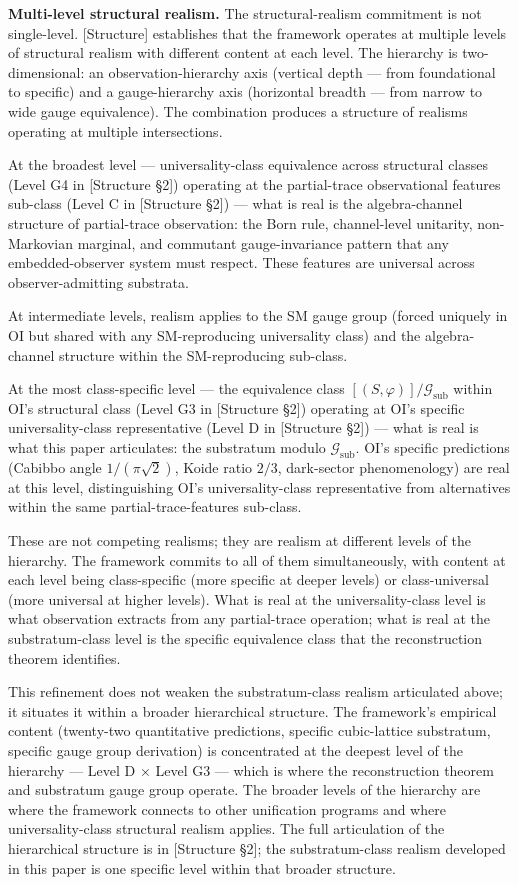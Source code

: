 \documentclass[
]{article}
\begin{document}
\textbf{Multi-level structural realism.} The structural-realism
commitment is not single-level. {[}Structure{]} establishes that the
framework operates at multiple levels of structural realism with
different content at each level. The hierarchy is two-dimensional: an
observation-hierarchy axis (vertical depth --- from foundational to
specific) and a gauge-hierarchy axis (horizontal breadth --- from narrow
to wide gauge equivalence). The combination produces a structure of
realisms operating at multiple intersections.

At the broadest level --- universality-class equivalence across
structural classes (Level G4 in {[}Structure §2{]}) operating at the
partial-trace observational features sub-class (Level C in {[}Structure
§2{]}) --- what is real is the algebra-channel structure of
partial-trace observation: the Born rule, channel-level unitarity,
non-Markovian marginal, and commutant gauge-invariance pattern that any
embedded-observer system must respect. These features are universal
across observer-admitting substrata.

At intermediate levels, realism applies to the SM gauge group (forced
uniquely in OI but shared with any SM-reproducing universality class)
and the algebra-channel structure within the SM-reproducing sub-class.

At the most class-specific level --- the equivalence class
\([(S, \varphi)] / \mathcal{G}_{\text{sub}}\) within OI's structural
class (Level G3 in {[}Structure §2{]}) operating at OI's specific
universality-class representative (Level D in {[}Structure §2{]}) ---
what is real is what this paper articulates: the substratum modulo
\(\mathcal{G}_{\text{sub}}\). OI's specific predictions (Cabibbo angle
\(1/(\pi\sqrt{2})\), Koide ratio \(2/3\), dark-sector phenomenology) are
real at this level, distinguishing OI's universality-class
representative from alternatives within the same partial-trace-features
sub-class.

These are not competing realisms; they are realism at different levels
of the hierarchy. The framework commits to all of them simultaneously,
with content at each level being class-specific (more specific at deeper
levels) or class-universal (more universal at higher levels). What is
real at the universality-class level is what observation extracts from
any partial-trace operation; what is real at the substratum-class level
is the specific equivalence class that the reconstruction theorem
identifies.

This refinement does not weaken the substratum-class realism articulated
above; it situates it within a broader hierarchical structure. The
framework's empirical content (twenty-two quantitative predictions,
specific cubic-lattice substratum, specific gauge group derivation) is
concentrated at the deepest level of the hierarchy --- Level D × Level
G3 --- which is where the reconstruction theorem and substratum gauge
group operate. The broader levels of the hierarchy are where the
framework connects to other unification programs and where
universality-class structural realism applies. The full articulation of
the hierarchical structure is in {[}Structure §2{]}; the
substratum-class realism developed in this paper is one specific level
within that broader structure.
\end{document}
